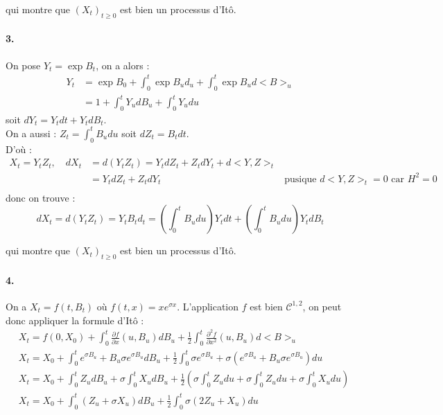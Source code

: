 \documentclass[a4paper,10pt]{report}
\begin{document}
qui montre que $(X_t)_{t \geq 0}$ est bien un processus d'Itô.


\paragraph{3.} On pose $Y_t = \exp{B_t}$, on a alors :
$$
\begin{aligned}
Y_t & = \exp{B_0} + \int_0^t \exp{B_u} d_u + \int_0^t \exp{B_u} d<B>_u \\
& = 1 + \int_0^tY_u dB_u + \int_0^t Y_u du
\end{aligned}
$$
soit $dY_t = Y_t dt + Y_t dB_t$.\\
On a aussi : $ Z_t = \int_0^t B_u du$ soit $dZ_t= B_t dt$.\\
D'où :
$$
\begin{aligned}
X_t = Y_tZ_t, \quad  dX_t & = d(Y_tZ_t) = Y_tdZ_t + Z_tdY_t + d<Y,Z>_t & \\
& = Y_tdZ_t + Z_tdY_t  & \text{pusique } d<Y,Z>_t = 0 \text{  car  } H^2 = 0 \\
\end{aligned}
$$
donc on trouve :
$$
dX_t = d(Y_tZ_t) = Y_tB_td_t = \left( \int_0^tB_udu \right)Y_tdt + \left( \int_0^t  B_u du \right) Y_t dB_t
$$

qui montre que $(X_t)_{t \geq 0}$ est bien un processus d'Itô.



\paragraph{4.} On a $X_t = f(t, B_t)$ où $f(t,x) = x e^{\sigma x}$. L'application $f$ est bien $\mathcal{C}^{1,2}$, on peut donc appliquer la formule d'Itô : 
$$
\begin{aligned}
& X_t = f(0,X_0) + \int_0^t \frac{\partial f}{\partial x} (u,B_u)dB_u + \frac{1}{2}  \int_0^t \frac{\partial^2 f}{\partial x^2} (u,B_u) d<B>_u \\
& X_t = X_0 + \int_0^t e^{\sigma B_u} + B_u \sigma e^{\sigma B_u} dB_u + \frac{1}{2} \int_0^t \sigma e^{\sigma B_u} + \sigma \left( e^{\sigma B_u} + B_u \sigma e^{\sigma B_u} \right) du \\
& X_t = X_0 + \int_0^t Z_u dB_u + \sigma \int_0^t X_u dB_u + \frac{1}{2} \left( \sigma \int_0^t Z_u du + \sigma \int_0^t Z_u du + \sigma \int_0^t X_u du \right) \\
& X_t = X_0 + \int_0^t (Z_u + \sigma X_u) dB_u + \frac{1}{2} \int_0^t \sigma (2 Z_u + X_u) du
\end{aligned}
$$
\end{document}
